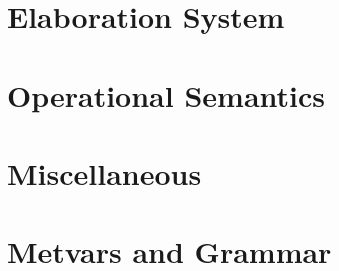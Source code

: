 \documentclass[11pt]{article}%
\begin{document}
\section{Elaboration System}
\cndefnsinfXXres%
\cndefnselabXXaction%
\cndefnselabXXmemop%
\cndefnselabXXspine%
\cndefnselabXXexpr%
\cndefnselab%

\section{Operational Semantics}
\cndefnssubsXXjudge%
\cndefnspureXXopsem%
\cndefnsopsem%

\section{Miscellaneous}
\cndefnsproofXXdefns%
\cndefnsspecXXdefns%
\cndefnsheapXXsat%

\section{Metvars and Grammar}
\cnmetavars\\[\baselineskip]
\cngrammar%
\end{document}
